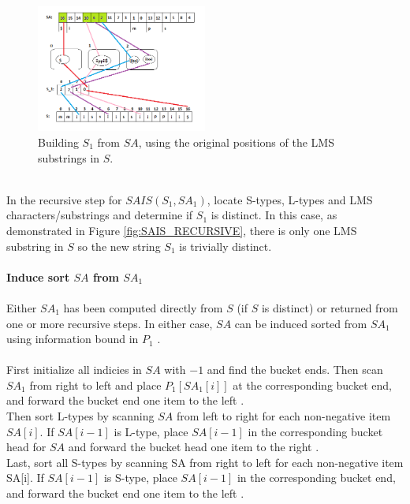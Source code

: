 \documentclass[12pt]{article} %
\begin{document}
\\
\begin{figure}[H]
    \centering
    \includegraphics[width=0.5\textwidth]{SAIS_LMSS}
    \captionsetup{width=0.8\textwidth}
    \caption{Building $S_1$ from $SA$, using the original positions of the LMS substrings in $S$.}
    \label{fig:SAIS_LMSS}
\end{figure}
\\
In the recursive step for $SAIS(S_1, SA_1)$, locate S-types, L-types and LMS characters/substrings and determine if $S_1$ is distinct. In this case, as demonstrated in Figure  \ref{fig:SAIS_RECURSIVE}, there is only one LMS substring in $S$ so the new string $S_1$ is trivially distinct.
\\ \\
\textbf{Induce sort $SA$ from $SA_{1}$}
\\ \\
Either $SA_{1}$ has been computed directly from $S$ (if $S$ is distinct) or returned from one or more recursive steps. In either case, $SA$ can be induced sorted from $SA_1$ using information bound in $P_1$ \cite{twoeffecient}. 
\\ \\
First initialize all indicies in $SA$ with $-1$ and find the bucket ends. Then scan $SA_1$ from right to left and place $P_1[SA_1[i]]$ at the corresponding bucket end, and forward the bucket end one item to the left \cite{twoeffecient}. 
 \\
Then sort L-types by scanning $SA$ from left to right for each non-negative item $SA[i]$. If  $SA[i-1]$ is L-type, place $SA[i-1]$ in the corresponding bucket head for $SA$ and forward the bucket head one item to the right \cite{twoeffecient}.
\\
Last, sort all S-types by scanning SA from right to left for each non-negative item SA[i]. If  $SA[i-1]$ is S-type, place $SA[i-1]$ in the corresponding bucket end, and forward the bucket end one item to the left \cite{twoeffecient}. 
\\
\end{document}
